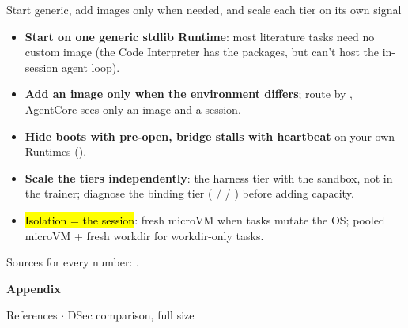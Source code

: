 \begin{frame}{Start generic, add images only when needed, and scale each tier on its own signal}
\begin{itemize}\small\setlength{\itemsep}{2.2mm}
\item \textbf{Start on one generic stdlib Runtime}: most literature tasks need no custom image (the Code Interpreter has the packages, but can't host the in-session agent loop).
\item \textbf{Add an image only when the environment differs}; route by , AgentCore sees only an image and a session.
\item \textbf{Hide boots with pre-open, bridge stalls with heartbeat} on your own Runtimes ().
\item \textbf{Scale the tiers independently}: the harness tier with the sandbox, not in the trainer; diagnose the binding tier ( /  / ) before adding capacity.
\item \hl{Isolation = the session}: fresh microVM when tasks mutate the OS; pooled microVM + fresh workdir for workdir-only tasks.
\end{itemize}
{\scriptsize\color{footc}Sources for every number: .}
\end{frame}

\appendix
\gdef\secname{Appendix}
{
\begin{frame}[plain]
\vfill
{\fontsize{26}{30}\selectfont\bfseries\color{white}Appendix\par}
\vspace{3mm}
{\small\color{white}References $\cdot$ DSec comparison, full size\par}
\vfill
\end{frame}}

